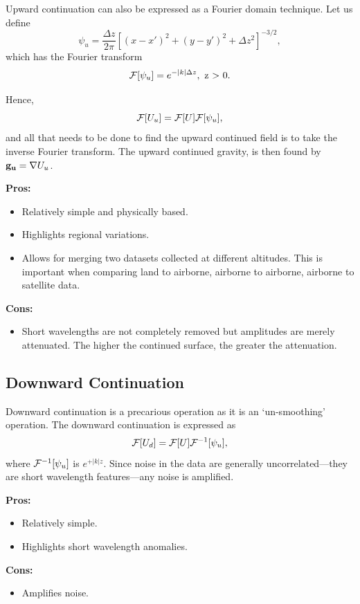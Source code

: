 Upward continuation can also be expressed as a Fourier domain technique.  Let us define
\begin{equation}
    \psi_{u} = \frac{\Delta z}{2 \pi} 
    \left[(x - x')^2 + (y - y')^2 + \Delta z^2 \right]^{-3/2},
\end{equation}
which has the Fourier transform
\begin{equation}
    \mathcal{F}[\psi_{u}] = e^{-|k|\Delta z}, \mbox{ z > 0}.
\end{equation}

Hence,
\begin{equation}
    \mathcal{F}[U_{u}] = \mathcal{F}[U]\mathcal{F}[\psi_{u}],
\end{equation}
and all that needs to be done to find the upward continued field is to take the inverse Fourier transform.  The upward continued gravity, is then found by $\vb{g_{u}} = \nabla U_{u}$.

{\bf Pros:}
\begin{itemize}
    \item Relatively simple and physically based.
    \item Highlights regional variations.
    \item Allows for merging two datasets collected at different altitudes.  This is important when comparing land to airborne, airborne to airborne, airborne to satellite data. 
\end{itemize}
{\bf Cons:}
\begin{itemize}
    \item Short wavelengths are not completely removed but amplitudes are merely attenuated.  The higher the continued surface, the greater the attenuation.
\end{itemize}

\subsection{Downward Continuation}
Downward continuation is a precarious operation as it is an `un-smoothing' operation.  The downward continuation is expressed as
\begin{equation}
    \mathcal{F}[U_{d}] = \mathcal{F}[U]\mathcal{F}^{-1}[\psi_{u}],
\end{equation}
where $\mathcal{F}^{-1}[\psi_{u}]$ is $e^{+|k|z}$.  Since noise in the data are generally uncorrelated---they are short wavelength features---any noise is amplified.

{\bf Pros:}
\begin{itemize}
    \item Relatively simple.
    \item Highlights short wavelength anomalies.
\end{itemize}
{\bf Cons:}
\begin{itemize}
    \item Amplifies noise.
\end{itemize}

